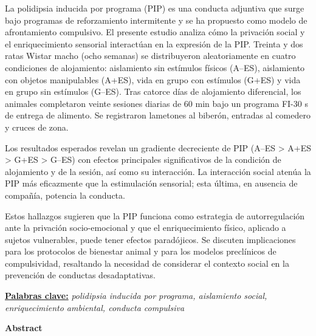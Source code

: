 \documentclass[12pt,a4paper]{article}
\begin{document}
    \begin{center}
    \begin{minipage}{0.9\textwidth}
    \noindent
    La polidipsia inducida por programa (PIP) es una conducta adjuntiva que surge bajo programas de reforzamiento intermitente y se ha propuesto como modelo de afrontamiento compulsivo. El presente estudio analiza cómo la privación social y el enriquecimiento sensorial interactúan en la expresión de la PIP. Treinta y dos ratas Wistar macho (ocho semanas) se distribuyeron aleatoriamente en cuatro condiciones de alojamiento: aislamiento sin estímulos físicos (A--ES), aislamiento con objetos manipulables (A+ES), vida en grupo con estímulos (G+ES) y vida en grupo sin estímulos (G--ES). Tras catorce días de alojamiento diferencial, los animales completaron veinte sesiones diarias de 60 min bajo un programa FI-30 s de entrega de alimento. Se registraron lametones al biberón, entradas al comedero y cruces de zona.
    
    Los resultados esperados revelan un gradiente decreciente de PIP (A--ES > A+ES > G+ES > G--ES) con efectos principales significativos de la condición de alojamiento y de la sesión, así como su interacción. La interacción social atenúa la PIP más eficazmente que la estimulación sensorial; esta última, en ausencia de compañía, potencia la conducta.

    Estos hallazgos sugieren que la PIP funciona como estrategia de autorregulación ante la privación socio-emocional y que el enriquecimiento físico, aplicado a sujetos vulnerables, puede tener efectos paradójicos. Se discuten implicaciones para los protocolos de bienestar animal y para los modelos preclínicos de compulsividad, resaltando la necesidad de considerar el contexto social en la prevención de conductas desadaptativas.
    
    \vspace{2mm}
    \noindent
    \underline{\textbf{Palabras clave:}} \textit{polidipsia inducida por programa, aislamiento social, enriquecimiento ambiental, conducta compulsiva}
    \end{minipage}
    \end{center}
    
    \vspace{5mm}
    
    \begin{center}
    \textbf{\large Abstract}
    \end{center}
    
\end{document}
